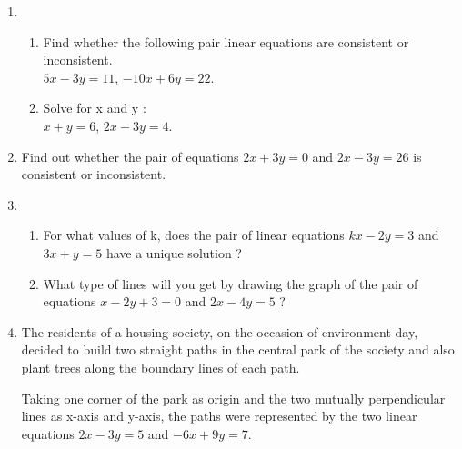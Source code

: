 \begin{enumerate}
\item 
\begin{enumerate}
    \item Find whether the following pair linear equations are consistent or 
inconsistent.\\
         $5x-3y=11$, $-10x+6y=22$.


    \item Solve for x and y : \\
         $x+y=6$, $2x-3y=4$.
 \end{enumerate}
 \item Find out whether the pair of equations $2x+3y=0$ and $2x-3y=26$ is consistent or inconsistent.
\item 
\begin{enumerate}
    \item For what values of k, does the pair of linear equations $kx-2y=3$ and $3x+y=5$ have a unique solution ?
    \item What type of lines will you get by drawing the graph of the pair of equations $x-2y+3=0$ and $2x-4y=5$ ?
\end{enumerate}
\item The residents of a housing society, on the occasion of environment day, decided to build two straight paths in the central park of the society and also plant trees along the boundary lines of each path.

Taking one corner of the park as origin and the two mutually perpendicular lines as x-axis and y-axis, the paths were represented by the two linear equations $2x-3y=5$ and $-6x+9y=7$.


\end{enumerate}
